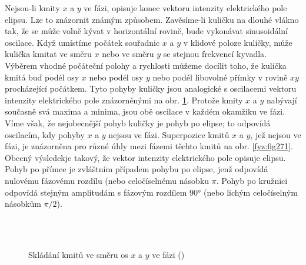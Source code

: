     Nejsou-li kmity \(x\) a \(y\) ve fázi, opisuje konec vektoru intenzity elektrického pole elipsu.
    Lze to znázornit známým způsobem. Zavěsíme-li kuličku na dlouhé vlákno tak, že se může volně
    kývat v horizontální rovině, bude vykonávat sinusoidální oscilace. Když umístíme počátek
    souřadnic \(x\) a \(y\) v klidové poloze kuličky, může kulička kmitat ve směru \(x\) nebo ve
    směru \(y\) se stejnou frekvencí kyvadla. Výběrem vhodné počáteční polohy a rychlosti můžeme
    docílit toho, že kulička kmitá buď podél osy \(x\) nebo podél osy \(y\) nebo podél libovolné
    přímky v rovině \(xy\) procházející počátkem. Tyto pohyby kuličky jsou analogické s oscilacemi
    vektoru intenzity elektrického pole znázorněnými na obr. \ref{fyz:fig270}. Protože kmity \(x\) a
    \(y\) nabývají současně svá maxima a minima, jsou obě oscilace v každém okamžiku ve fázi. Víme
    však, že nejobecnější pohyb kuličky je pohyb po elipse; to odpovídá oscilacím, kdy pohyby \(x\)
    a \(y\) nejsou ve fázi. Superpozice kmitů \(x\) a \(y\), jež nejsou ve fázi, je znázorněna pro
    různé úhly mezi fázemi těchto kmitů na obr. \ref{fyz:fig271}. Obecný výsledekje takový, že
    vektor intenzity elektrického pole opisuje elipsu. Pohyb po přímce je zvláštním případem pohybu
    po elipse, jenž odpovídá nulovému fázovému rozdílu (nebo celočíselnému násobku \(\pi\). Pohyb po
    kružnici odpovídá stejným amplitudám s fázovým rozdílem \ang{90} (nebo lichým celočíselným
    násobkům \(\pi/2\)).

    \begin{figure}[ht!]  %
      \centering
        {}               
        {}                                                 \\
        {}                         
        {}                                                 \\         
        {}                         
        {}
      \caption{Skládání kmitů ve směru os \(x\) a \(y\) ve fázi (\cite[s.~437]{Feynman01})}
      \label{fyz:fig270}
    \end{figure}

